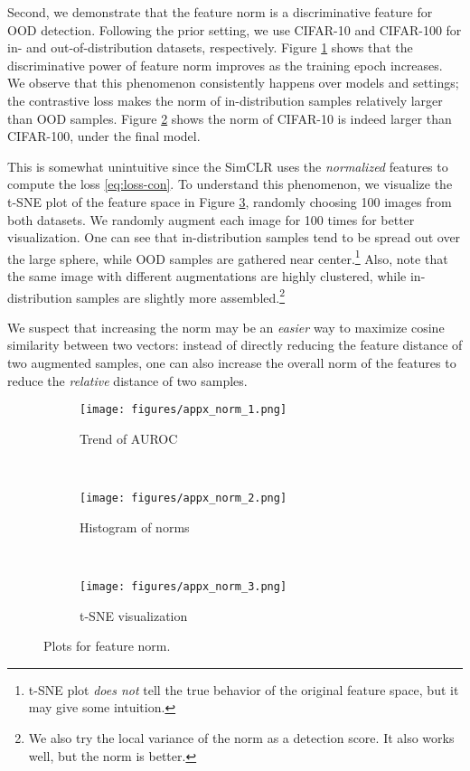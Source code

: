 \documentclass{article}
\begin{document}
 


\clearpage
Second, we demonstrate that the feature norm is a discriminative feature for OOD detection. Following the prior setting, we use CIFAR-10 and CIFAR-100 for in- and out-of-distribution datasets, respectively. Figure \ref{fig:norm-1} shows that the discriminative power of feature norm improves as the training epoch increases. We observe that this phenomenon consistently happens over models and settings; the contrastive loss makes the norm of in-distribution samples relatively larger than OOD samples. Figure \ref{fig:norm-2} shows the norm of CIFAR-10 is indeed larger than CIFAR-100, under the final model.

This is somewhat unintuitive since the SimCLR uses the \textit{normalized} features to compute the loss \eqref{eq:loss-con}. To understand this phenomenon, we visualize the t-SNE \citep{maaten2008visualizing} plot of the feature space in Figure \ref{fig:norm-3}, randomly choosing 100 images from both datasets. We randomly augment each image for 100 times for better visualization. One can see that in-distribution samples tend to be spread out over the large sphere, while OOD samples are gathered near center.\footnote{t-SNE plot \textit{does not} tell the true behavior of the original feature space, but it may give some intuition.} Also, note that the same image with different augmentations are highly clustered, while in-distribution samples are slightly more assembled.\footnote{We also try the local variance of the norm as a detection score. It also works well, but the norm is better.}

We suspect that increasing the norm may be an \textit{easier} way to maximize cosine similarity between two vectors: instead of directly reducing the feature distance of two augmented samples, one can also increase the overall norm of the features to reduce the \textit{relative} distance of two samples.



\begin{figure*}[h]
\centering
\begin{subfigure}{0.32\textwidth}
\texttt{[image: figures/appx\_norm\_1.png]}
\caption{Trend of AUROC}\label{fig:norm-1}
\end{subfigure}
~\begin{subfigure}{0.32\textwidth}
\texttt{[image: figures/appx\_norm\_2.png]}
\caption{Histogram of norms}\label{fig:norm-2}
\end{subfigure}
~\begin{subfigure}{0.32\textwidth}
\texttt{[image: figures/appx\_norm\_3.png]}
\caption{t-SNE visualization}\label{fig:norm-3}
\end{subfigure}
\caption{
Plots for feature norm.
}\label{fig:norm}
\end{figure*}
\end{document}
